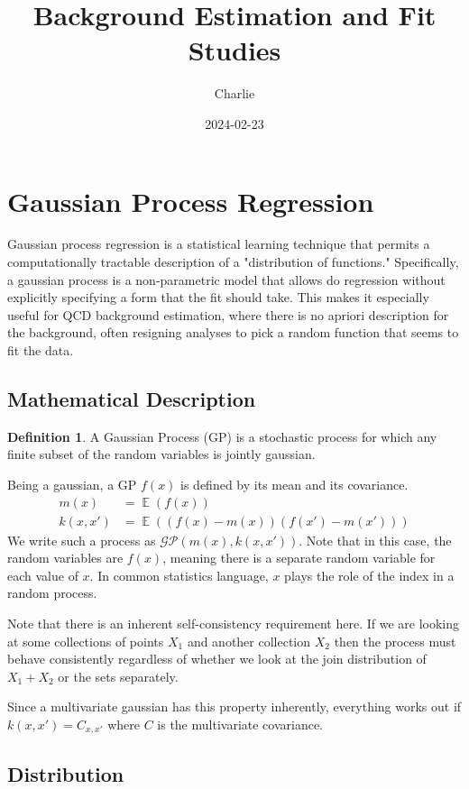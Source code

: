 \documentclass[10pt]{article}
\author{Charlie}
\title{Background Estimation and Fit Studies}
\date{2024-02-23}
\DeclareMathOperator{\Ex}{\mathbb{E}}%
\newcommand{\gp}{\mathcal{GP}}
\theoremstyle{definition}
\newtheorem{definition}{Definition}[section]
\begin{document}
\section{Gaussian Process Regression}

Gaussian process regression is a statistical learning technique that permits a computationally tractable description of a "distribution of functions."
Specifically, a gaussian process is a non-parametric model that allows do regression without explicitly specifying a form that the fit should take.
This makes it especially useful for QCD background estimation, where there is no apriori description for the background, often resigning analyses to pick a random function that seems to fit the data. 

\subsection{Mathematical Description}

\begin{definition}
  A Gaussian Process (GP) is a stochastic process for which any finite subset of the random variables is jointly gaussian. 
\end{definition}


Being a gaussian, a GP $f(x)$ is defined by its mean and its covariance.
\begin{align}
  m(x) &= \Ex\left(f(x)\right) \\
  k(x,x') &= \Ex\left( ( f(x) - m(x) ) (f(x') - m(x'))\right) 
\end{align}
We write such a process as $\gp(m(x), k(x,x'))$. Note that in this case, the random variables are $f(x)$, meaning there is a separate random variable for each value of $x$.
In common statistics language, $x$ plays the role of the index in a random process.

Note that there is an inherent self-consistency requirement here. If we are looking at some collections of points $X_1$ and another collection $X_2$ then the process must behave consistently regardless of whether we look at the join distribution of $X_1 + X_2$ or the sets separately.

Since a multivariate gaussian has this property inherently, everything works out if $k(x,x') = C_{x,x'}$ where $C$ is the multivariate covariance. 

\subsection{Distribution}
\end{document}
